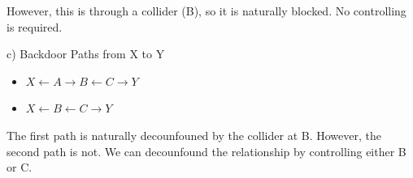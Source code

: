 \documentclass[11pt]{article}
\begin{document}
However, this is through a collider (B), so it is naturally blocked. No controlling is required.

c) Backdoor Paths from X to Y
\begin{itemize}
	\item ${X \leftarrow A \rightarrow B \leftarrow C \rightarrow Y}$
	\item ${X \leftarrow B \leftarrow C \rightarrow Y}$
\end{itemize}

The first path is naturally decounfouned by the collider at B. However, the second path is not. We can decounfound the relationship by controlling either B or C.
\end{document}
